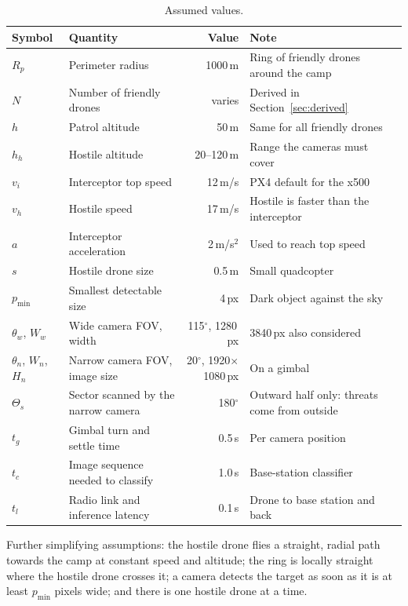 \documentclass{article}
\begin{document}
\begin{table}[H]
\centering
\small
\begin{tabular}{|l|p{}|r|p{}|}
\hline
\textbf{Symbol} & \textbf{Quantity} & \textbf{Value} & \textbf{Note} \\
\hline
$R_p$ & Perimeter radius & 1000\,m & Ring of friendly drones around the camp \\
$N$ & Number of friendly drones & varies & Derived in Section~\ref{sec:derived} \\
$h$ & Patrol altitude & 50\,m & Same for all friendly drones \\
$h_h$ & Hostile altitude & 20--120\,m & Range the cameras must cover \\
$v_i$ & Interceptor top speed & 12\,m/s & PX4 default for the x500 \\
$v_h$ & Hostile speed & 17\,m/s & Hostile is faster than the interceptor \\
$a$ & Interceptor acceleration & 2\,m/s$^2$ & Used to reach top speed \\
$s$ & Hostile drone size & 0.5\,m & Small quadcopter \\
$p_{\min}$ & Smallest detectable size & 4\,px & Dark object against the sky \\
$\theta_w$, $W_w$ & Wide camera FOV, width & 115$^\circ$, 1280\,px & 3840\,px also considered \\
$\theta_n$, $W_n$, $H_n$ & Narrow camera FOV, image size & 20$^\circ$, 1920$\times$1080\,px & On a gimbal \\
$\Theta_s$ & Sector scanned by the narrow camera & 180$^\circ$ & Outward half only: threats come from outside \\
$t_g$ & Gimbal turn and settle time & 0.5\,s & Per camera position \\
$t_c$ & Image sequence needed to classify & 1.0\,s & Base-station classifier \\
$t_l$ & Radio link and inference latency & 0.1\,s & Drone to base station and back \\
\hline
\end{tabular}
\caption{Assumed values.}
\label{tab:assumptions}
\end{table}

Further simplifying assumptions: the hostile drone flies a straight, radial
path towards the camp at constant speed and altitude; the ring is locally
straight where the hostile drone crosses it; a camera detects the target as
soon as it is at least $p_{\min}$ pixels wide; and there is one hostile drone
at a time.
\end{document}
